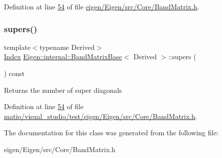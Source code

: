 Definition at line \hyperlink{eigen_2_eigen_2src_2_core_2_band_matrix_8h_source_l00054}{54} of file \hyperlink{eigen_2_eigen_2src_2_core_2_band_matrix_8h_source}{eigen/\+Eigen/src/\+Core/\+Band\+Matrix.\+h}.

\mbox{\label{class_eigen_1_1internal_1_1_band_matrix_base_a58617da0d75d22b1f8dfdfde702ebb4a}} 
\subsubsection{\texorpdfstring{supers()}{supers()}\hspace{0.1cm}{\footnotesize\ttfamily [2/2]}}
{\footnotesize\ttfamily template$<$typename Derived$>$ \\
\hyperlink{group___core___module_a554f30542cc2316add4b1ea0a492ff02}{Index} \hyperlink{class_eigen_1_1internal_1_1_band_matrix_base}{Eigen\+::internal\+::\+Band\+Matrix\+Base}$<$ Derived $>$\+::supers (\begin{DoxyParamCaption}{ }\end{DoxyParamCaption}) const\hspace{0.3cm}{\ttfamily [inline]}}

\begin{DoxyReturn}{Returns}
the number of super diagonals 
\end{DoxyReturn}


Definition at line \hyperlink{matio_2visual__studio_2test_2eigen_2_eigen_2src_2_core_2_band_matrix_8h_source_l00054}{54} of file \hyperlink{matio_2visual__studio_2test_2eigen_2_eigen_2src_2_core_2_band_matrix_8h_source}{matio/visual\+\_\+studio/test/eigen/\+Eigen/src/\+Core/\+Band\+Matrix.\+h}.



The documentation for this class was generated from the following file\+:\begin{DoxyCompactItemize}
\item 
eigen/\+Eigen/src/\+Core/\+Band\+Matrix.\+h\end{DoxyCompactItemize}
